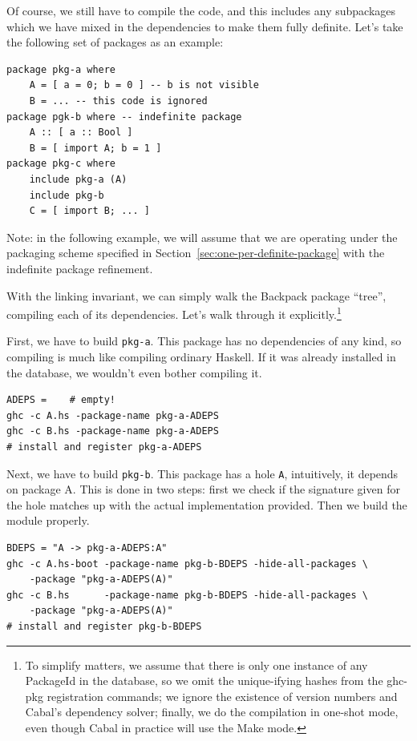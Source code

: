 \documentclass{article}
\begin{document}
Of course, we still have to compile the code, and this includes any
subpackages which we have mixed in the dependencies to make them fully
definite.  Let's take the following set of packages as an example:

\begin{verbatim}
package pkg-a where
    A = [ a = 0; b = 0 ] -- b is not visible
    B = ... -- this code is ignored
package pgk-b where -- indefinite package
    A :: [ a :: Bool ]
    B = [ import A; b = 1 ]
package pkg-c where
    include pkg-a (A)
    include pkg-b
    C = [ import B; ... ]
\end{verbatim}

Note: in the following example, we will assume that we are operating
under the packaging scheme specified in Section~\ref{sec:one-per-definite-package}
with the indefinite package refinement.

With the linking invariant, we can simply walk the Backpack package ``tree'',
compiling each of its dependencies.  Let's walk through it explicitly.\footnote{To simplify matters, we assume that there is only one instance of any
PackageId in the database, so we omit the unique-ifying hashes from the
ghc-pkg registration commands; we ignore the existence of version numbers
and Cabal's dependency solver; finally, we do the compilation in
one-shot mode, even though Cabal in practice will use the Make mode.}

First, we have to build \verb|pkg-a|.  This package has no dependencies
of any kind, so compiling is much like compiling ordinary Haskell.  If
it was already installed in the database, we wouldn't even bother compiling it.

\begin{verbatim}
ADEPS =    # empty!
ghc -c A.hs -package-name pkg-a-ADEPS
ghc -c B.hs -package-name pkg-a-ADEPS
# install and register pkg-a-ADEPS
\end{verbatim}

Next, we have to build \verb|pkg-b|.  This package has a hole \verb|A|,
intuitively, it depends on package A.   This is done in two steps:
first we check if the signature given for the hole matches up with the
actual implementation provided. Then we build the module properly.

\begin{verbatim}
BDEPS = "A -> pkg-a-ADEPS:A"
ghc -c A.hs-boot -package-name pkg-b-BDEPS -hide-all-packages \
    -package "pkg-a-ADEPS(A)"
ghc -c B.hs      -package-name pkg-b-BDEPS -hide-all-packages \
    -package "pkg-a-ADEPS(A)"
# install and register pkg-b-BDEPS
\end{verbatim}
\end{document}
